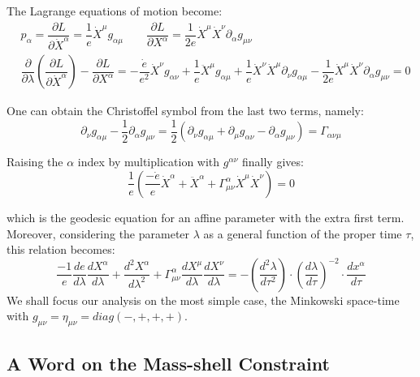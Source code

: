 \documentclass[twoside,a4paper,11pt]{article}
\numberwithin{equation}{section}
\begin{document}
The Lagrange equations of motion become:
\begin{subequations}
\begin{eqnarray}
    & p_\alpha  = \dfrac{\partial L}{\partial \dot{X}^\alpha} = \dfrac{1}{e} \dot{X}^{\mu}g_{\alpha \mu}
    \label{generalizedmomentum}  \qquad \dfrac{\partial L}{\partial X^\alpha} = \dfrac{1}{2e}\dot{X}^\mu \dot{X}^\nu \partial_\alpha g_{\mu\nu}
\\
    & \dfrac{\partial}{\partial \lambda}\left( \dfrac{\partial L}{\partial \dot{X}^\alpha}\right)  - \dfrac{\partial L}{\partial X^\alpha}  =  -\dfrac{\dot{e}}{e^2}\dot{X}^\nu g_{\alpha \nu} + \dfrac{1}{e}\ddot{X}^\mu g_{\alpha \mu} + \dfrac{1}{e}\dot{X}^\nu \dot{X}^\mu \partial_\nu g_{\alpha \mu} - \dfrac{1}{2e}\dot{X}^\mu \dot{X}^\nu \partial_\alpha g_{\mu \nu} = 0
\end{eqnarray}
\end{subequations}

One can obtain the Christoffel symbol from the last two terms, namely:
\begin{equation}
    \partial_\nu g_{\alpha \mu} - \frac{1}{2}\partial_\alpha g_{\mu \nu} = \frac{1}{2} \left( \partial_\nu g_{\alpha \mu} + \partial_\mu g_{\alpha \nu} - \partial_\alpha g_{\mu \nu} \right) = \Gamma_{\alpha \nu \mu}
\end{equation}

Raising the $\alpha$ index by multiplication with $g^{\alpha \nu}$ finally gives:
\begin{equation}
    \frac{1}{e}\left(\frac{-\dot{e}}{e}\dot{X}^\alpha + \ddot{X}^\alpha + \Gamma^\alpha_{\mu \nu} \dot{X}^\mu \dot{X}^\nu\right) = 0
\end{equation}

which is the geodesic equation for an affine parameter with the extra first term. Moreover, considering the parameter $\lambda$ as a general function of the proper time $\tau$, this relation becomes:
\begin{equation}
    \frac{-1}{e}\frac{de}{d\lambda}\frac{dX^\alpha}{d\lambda} + \frac{d^2X^\alpha}{d\lambda^2} + \Gamma^\alpha_{\mu \nu}\frac{dX^\mu}{d\lambda}\frac{dX^\nu}{d\lambda} = - \left(\frac{d^2 \lambda}{d\tau^2} \right)\cdot \left(\frac{d\lambda}{d\tau} \right)^{-2}\cdot\frac{dx^\alpha}{d\tau}
\end{equation}
We shall focus our analysis on the most simple case, the Minkowski space-time with $g_{\mu\nu} = \eta_{\mu\nu}= diag(-,+,+,+)$.


\subsection{A Word on the Mass-shell Constraint}
\end{document}
